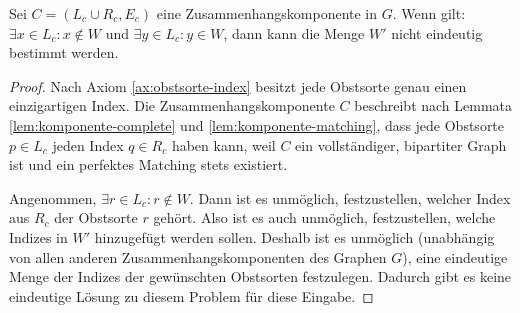 \begin{lemma}\label{lem:komponente-one-not-wunschliste}
Sei $C = (L_c \cup R_c, E_c)$ eine Zusammenhangskomponente in $G$.
Wenn gilt: $\exists x \in L_c : x \notin W$ und $\exists y \in L_c : y \in W$,
dann kann die Menge $W'$ nicht eindeutig
bestimmt werden.
\end{lemma}
\begin{proof}
Nach Axiom \ref{ax:obstsorte-index} besitzt jede Obstsorte genau einen einzigartigen Index.
Die Zusammenhangskomponente $C$ beschreibt nach Lemmata \ref{lem:komponente-complete} und \ref{lem:komponente-matching},
dass jede Obstsorte $p \in L_c$ jeden Index $q \in R_c$ haben kann, weil $C$ ein vollständiger, bipartiter Graph ist und ein perfektes Matching stets existiert.

Angenommen, $\exists r \in L_c : r \notin W$. Dann ist es unmöglich, festzustellen,
welcher Index aus $R_c$ der Obstsorte $r$ gehört.
Also ist es auch unmöglich, festzustellen, welche Indizes in $W'$ hinzugefügt werden sollen.
Deshalb
ist es unmöglich (unabhängig von allen anderen Zusammenhangskomponenten des Graphen $G$),
eine eindeutige Menge der Indizes der gewünschten Obstsorten festzulegen.
Dadurch gibt es keine eindeutige Lösung zu diesem Problem für diese Eingabe.
\end{proof}
